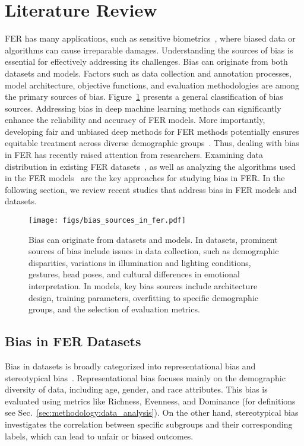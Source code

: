\section{Literature Review}
\label{sec:literature_review}
FER has many applications, such as sensitive biometrics~\cite{igene2024face}, where biased data or algorithms can cause irreparable damages. Understanding the sources of bias is essential for effectively addressing its challenges. Bias can originate from both datasets and models. Factors such as data collection and annotation processes, model architecture, objective functions, and evaluation methodologies are among the primary sources of bias. Figure~\ref{fig:bias_sources_in_fer} presents a general classification of bias sources. Addressing bias in deep machine learning methods can significantly enhance the reliability and accuracy of FER models. More importantly, developing fair and unbiased deep methods for FER methods potentially ensures equitable treatment across diverse demographic groups~\cite{amigo2023mitigating}. Thus, dealing with bias in FER has recently raised attention from researchers. Examining data distribution in existing FER datasets~\cite{dominguez2024metrics, dominguez2022gender, dominguez2022assessing, li2020deeper, huber2024bias, cheong2023causal}, as well as analyzing the algorithms used in the FER 
 models~\cite{xu2020investigating, yu2023exploring, dooley2024rethinking, kolahdouzi2023toward, liang2023benchmarking, abdullah2024effects} are the key approaches for studying bias in FER. In the following section, we review recent studies that address bias in FER models and datasets.

\begin{figure}[b!]
\centering
\caption{Bias can originate from datasets and models. In datasets, prominent sources of bias include issues in data collection, such as demographic disparities, variations in illumination and lighting conditions, gestures, head poses, and cultural differences in emotional interpretation. In models, key bias sources include architecture design, training parameters, overfitting to specific demographic groups, and the selection of evaluation metrics.}
\texttt{[image: figs/bias\_sources\_in\_fer.pdf]}
\label{fig:bias_sources_in_fer}
\end{figure}

\subsection{Bias in FER Datasets} 
\label{sec:literature_review:bias_in_fer_datasets}
Bias in datasets is broadly categorized into representational bias and stereotypical bias~\cite{dominguez2024metrics, dominguez2022gender, dominguez2022assessing}. Representational bias focuses mainly on the demographic diversity of data, including age, gender, and race attributes. This bias is evaluated using metrics like Richness, Evenness, and Dominance (for definitions see Sec.~\ref{sec:methodology:data_analysis}). On the other hand, stereotypical bias investigates the correlation between specific subgroups and their corresponding labels, which can lead to unfair or biased outcomes. 

